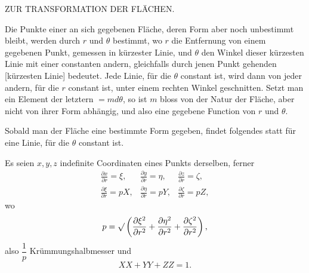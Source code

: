 \clearpage
{}
\begin{center}\large ZUR TRANSFORMATION DER FLÄCHEN.\end{center}
\noindent\hspace*{1.2em}Die Punkte einer an sich gegebenen Fläche, deren Form aber noch unbestimmt bleibt, werden durch $r$ und $\theta$ bestimmt, wo $r$ die Entfernung von einem gegebenen Punkt, gemessen in kürzester Linie, und $\theta$ den Winkel dieser kürzesten Linie mit einer constanten andern, gleichfalls durch jenen Punkt gehenden [kürzesten Linie] bedeutet. Jede Linie, für die $\theta$ constant ist, wird dann von jeder andern, für die $r$ constant ist, unter einem rechten Winkel geschnitten. Setzt man ein Element der letztern $=md\theta$, so ist $m$ bloss von der Natur der Fläche, aber nicht von ihrer Form abhängig, und also eine gegebene Function von $r$ und $\theta$.

Sobald man der Fläche eine bestimmte Form gegeben, findet folgendes statt für eine Linie, für die $\theta$ constant ist.

Es seien $x,y,z$ indefinite Coordinaten eines Punkts derselben, ferner
\[
\begin{array}{lll}
\displaystyle\frac{\partial x}{\partial r}=\xi,&\displaystyle\frac{\partial y}{\partial r}=\eta,&\displaystyle\frac{\partial z}{\partial r}=\zeta,\\[6pt]
\displaystyle\frac{\partial\xi}{\partial r}=pX,&\displaystyle\frac{\partial\eta}{\partial r}=pY,&\displaystyle\frac{\partial\zeta}{\partial r}=pZ,
\end{array}
\]
\noindent wo
\[
p=\mathord{\surd}\left(\frac{\partial\xi^2}{\partial r^2}+\frac{\partial\eta^2}{\partial r^2}+\frac{\partial\zeta^2}{\partial r^2}\right),
\]
\noindent also $\dfrac1p$ Krümmungshalbmesser und
\[
XX+YY+ZZ=1.
\]
